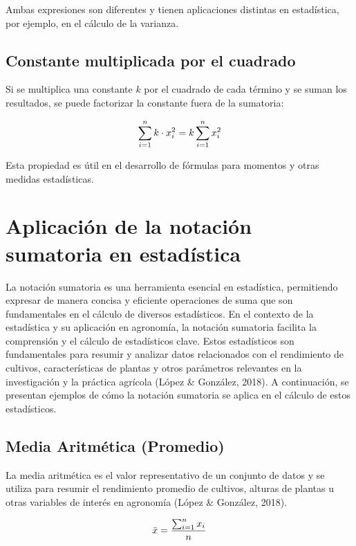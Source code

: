 \documentclass[
  spanish,
  letterpaper,
]{book}
\begin{document}
Ambas expresiones son diferentes y tienen aplicaciones distintas en
estadística, por ejemplo, en el cálculo de la varianza.

\subsection{Constante multiplicada por el
cuadrado}\label{constante-multiplicada-por-el-cuadrado}

Si se multiplica una constante \(k\) por el cuadrado de cada término y
se suman los resultados, se puede factorizar la constante fuera de la
sumatoria:

\[{\huge \sum_{i=1}^{n} k \cdot x_i^2 = k \sum_{i=1}^{n} x_i^2}\]

Esta propiedad es útil en el desarrollo de fórmulas para momentos y
otras medidas estadísticas.

\section{Aplicación de la notación sumatoria en
estadística}\label{aplicaciuxf3n-de-la-notaciuxf3n-sumatoria-en-estaduxedstica}

La notación sumatoria es una herramienta esencial en estadística,
permitiendo expresar de manera concisa y eficiente operaciones de suma
que son fundamentales en el cálculo de diversos estadísticos. En el
contexto de la estadística y su aplicación en agronomía, la notación
sumatoria facilita la comprensión y el cálculo de estadísticos clave.
Estos estadísticos son fundamentales para resumir y analizar datos
relacionados con el rendimiento de cultivos, características de plantas
y otros parámetros relevantes en la investigación y la práctica agrícola
(López \& González, 2018). A continuación, se presentan ejemplos de cómo
la notación sumatoria se aplica en el cálculo de estos estadísticos.

\subsection{Media Aritmética
(Promedio)}\label{media-aritmuxe9tica-promedio}

La media aritmética es el valor representativo de un conjunto de datos y
se utiliza para resumir el rendimiento promedio de cultivos, alturas de
plantas u otras variables de interés en agronomía (López \& González,
2018).

\[
\huge
\bar{x} = \frac{\sum_{i=1}^{n} x_i}{n}
\]
\end{document}
